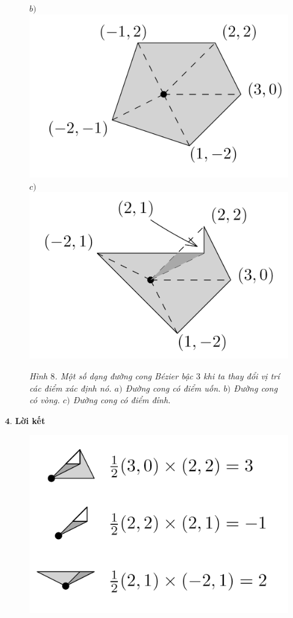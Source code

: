 \begin{multicols}{2}
\begin{figure}[H]
			$b)$\includegraphics[width= 0.83\linewidth]{13}
			$c)$\includegraphics[width= 0.83\linewidth]{14}
			\caption{\small\textit{\color{toanhocdoisong}Hình $8$. Một số dạng đường cong Bézier bậc $3$ khi ta thay đổi vị trí các điểm xác định nó. $a)$ Đường cong có điểm uốn. $b)$ Đường cong có vòng. $c)$ Đường cong có điểm đỉnh.}}
			\vspace*{-5pt}
		\end{figure}
		$\pmb4.$ \textbf{\color{toanhocdoisong}Lời kết}
		\begin{figure}[H]
			\vspace*{-5pt}
			\centering
			\captionsetup{labelformat= empty, justification=centering}
			\includegraphics[width= 1\linewidth]{15}

\end{figure}
\end{multicols}
